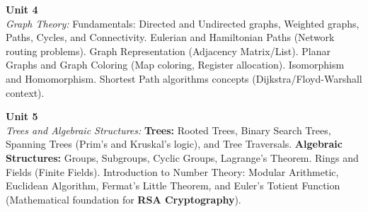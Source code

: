 \noindent\textbf{Unit 4} \\
\textit{Graph Theory:} Fundamentals: Directed and Undirected graphs, Weighted graphs, Paths, Cycles, and Connectivity. Eulerian and Hamiltonian Paths (Network routing problems). Graph Representation (Adjacency Matrix/List). Planar Graphs and Graph Coloring (Map coloring, Register allocation). Isomorphism and Homomorphism. Shortest Path algorithms concepts (Dijkstra/Floyd-Warshall context).

\vspace{0.3cm}

\noindent\textbf{Unit 5} \\
\textit{Trees and Algebraic Structures:} \textbf{Trees:} Rooted Trees, Binary Search Trees, Spanning Trees (Prim’s and Kruskal’s logic), and Tree Traversals. \textbf{Algebraic Structures:} Groups, Subgroups, Cyclic Groups, Lagrange’s Theorem. Rings and Fields (Finite Fields). Introduction to Number Theory: Modular Arithmetic, Euclidean Algorithm, Fermat’s Little Theorem, and Euler’s Totient Function (Mathematical foundation for \textbf{RSA Cryptography}).

\newpage
{}